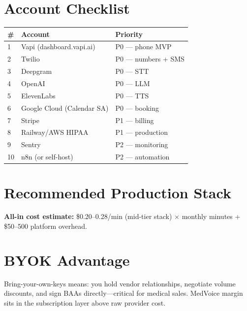 \documentclass[11pt,a4paper]{article}
\begin{document}
\section{Account Checklist}

\begin{center}
\small
\begin{tabular}{@{}lll@{}}
\toprule
\textbf{\#} & \textbf{Account} & \textbf{Priority} \\
\midrule
1 & Vapi (dashboard.vapi.ai) & P0 --- phone MVP \\
2 & Twilio & P0 --- numbers + SMS \\
3 & Deepgram & P0 --- STT \\
4 & OpenAI & P0 --- LLM \\
5 & ElevenLabs & P0 --- TTS \\
6 & Google Cloud (Calendar SA) & P0 --- booking \\
7 & Stripe & P1 --- billing \\
8 & Railway/AWS HIPAA & P1 --- production \\
9 & Sentry & P2 --- monitoring \\
10 & n8n (or self-host) & P2 --- automation \\
\bottomrule
\end{tabular}
\end{center}

\section{Recommended Production Stack}

\begin{center}
\end{center}

\textbf{All-in cost estimate:} \$0.20--0.28/min (mid-tier stack) $\times$ monthly minutes + \$50--500 platform overhead.

\section{BYOK Advantage}

Bring-your-own-keys means: you hold vendor relationships, negotiate volume discounts, and sign BAAs directly---critical for medical sales. MedVoice margin sits in the subscription layer above raw provider cost.
\end{document}

